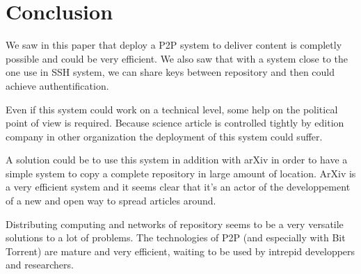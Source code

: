 \section{Conclusion}

We saw in this paper that deploy a P2P system to deliver content is completly
possible and could be very efficient. We also saw that with a system close 
to the one use in SSH system, we can share keys between repository and then
could achieve authentification.

Even if this system could work on a technical level, some help on the political
point of view is required. Because science article is controlled tightly by 
edition company in other organization the deployment of this system could suffer.

A solution could be to use this system in addition with arXiv in order to have a 
simple system to copy a complete repository in large amount of location. ArXiv is 
a very efficient system and it seems clear that it's an actor of the developpement 
of a new and open way to spread articles around.

Distributing computing and networks of repository seems to be a very versatile solutions
to a lot of problems. The technologies of P2P (and especially with Bit Torrent) are mature 
and very efficient, waiting to be used by intrepid developpers and researchers.
